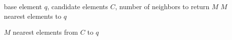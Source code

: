 \begin{algorithm}[H]
    \caption{SELECT-NEIGHBORS-SIMPLE \cite{Malkov-Yashunin-2016}}
    \label{alg:hnsw-3}
    \begin{algorithmic}[1]
        \Require base element $q$, candidate elements $C$, number of neighbors to return $M$
        \Ensure $M$ nearest elements to $q$
        
        \State \Return $M$ nearest elements from $C$ to $q$
    \end{algorithmic}
\end{algorithm}